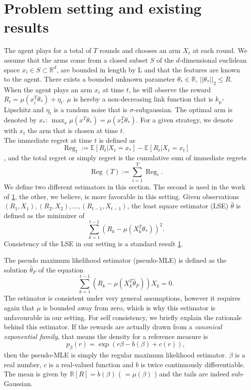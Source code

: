 \documentclass[twoside]{article} \usepackage{aistats2017}
\newcommand{\Reg} {
  \operatorname{Reg}}
\begin{document}
\section{Problem setting and existing results}
The agent plays for a total of $T$ rounds and chooses an arm $X_t$ at each round. 
We assume that the arms come from a closed subset $S$ of the $d$-dimensional euclidean space $x_i \in S\subset\mathbb{R}^d$, are bounded in length by L and that the features are known to the agent.
There exists a bounded unknown parameter $\theta_*\in \mathbb{R}$, $||\theta_*||_2 \leq R$.
When the agent plays an arm $x_i$ at time $t$, he will observe the reward $R_t = \mu(x_i^T\theta_*) +\eta_t$. $\mu$ is hereby a non-decreasing link function that is $k_\mu$-Lipschitz and $\eta_t$ is a random noise that is $\sigma$-subgaussian. The optimal arm is denoted by $x_*$: $\max_x\mu(x^T\theta_*) = \mu(x_*^T\theta_*)$. For a given strategy, we denote with $x_t$ the arm that is chosen at time $t$.\\
The immediate regret at time $t$ is defined as 
$$\Reg_t := \mathbb{E}\left[R_t|X_t=x_*\right]-\mathbb{E}\left[R_t|X_t=x_t\right]$$,
and the total regret or simply regret is the cumulative sum of immediate regrets
$$\Reg(T) := \sum_{i=1}^T \Reg_i.$$
We define two different estimators in this section.
The second is used in the work of \ref{}, the other, we believe, is more favorable in this setting.
Given observations $(R_1,X_1), (R_2,X_2),\ldots,(R_{t-1},X_{t-1})$, the least square estimator (LSE) $\hat{\theta}$ is defined as the minimizer of
$$\sum_{k=1}^{t-1}\left(R_k - \mu(X_k^T\theta_*)\right)^2.$$
Consistency of the LSE in our setting is a standard result \ref{}.

The pseudo maximum likelihood estimator (pseudo-MLE) is defined as the solution $\hat{\theta}_P$ of the equation
$$\sum_{k=1}^{t-1}(R_k-\mu(X_k^T\hat{\theta}_P))X_k = 0.$$
The estimator is consistent under very general assumptions, however it requires again that $\dot{\mu}$ is bounded away from zero, which is why this estimator is unfavourable in our setting.
For self consistency, we briefly explain the rationale behind this estimator.
If the rewards are actually drawn from a \textit{canonical exponential family}, that means the density for a reference measure is
$$p_\beta(r) = \exp(r\beta − b(\beta) + c(r)) ,$$
then the pseudo-MLE is simply the regular maximum likelihood estimator. $\beta$ is a real number, $c$ is a real-valued function and $b$ is twice continuously differentiable. The mean is given by $\mathbb{R}[R] = \dot{b}(\beta)$ ( $=\mu(\beta)$ ) and the tails are indeed sub-Gaussian. 
\end{document}
